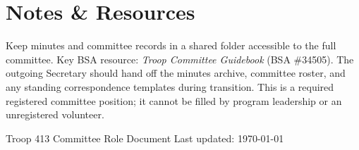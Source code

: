 \documentclass[11pt, letterpaper]{article}
\begin{document}
\vspace{0.6em}

\section{Notes \& Resources}
Keep minutes and committee records in a shared folder accessible to the full committee. Key BSA resource: \textit{Troop Committee Guidebook} (BSA \#34505). The outgoing Secretary should hand off the minutes archive, committee roster, and any standing correspondence templates during transition. This is a required registered committee position; it cannot be filled by program leadership or an unregistered volunteer.

\vfill
\begin{center}
  \footnotesize\color{gray}
  Troop 413 \textbullet{} Committee Role Document \textbullet{} Last updated: \today
\end{center}
\end{document}
